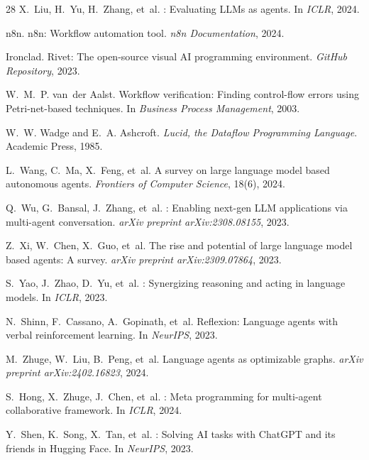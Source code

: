 \documentclass[11pt,twocolumn]{article}
\begin{document}
\begin{thebibliography}{28}
X.~Liu, H.~Yu, H.~Zhang, et~al.
: Evaluating {LLM}s as agents.
\newblock In \emph{ICLR}, 2024.

n8n.
\newblock n8n: Workflow automation tool.
\newblock \emph{n8n Documentation}, 2024.

Ironclad.
\newblock Rivet: The open-source visual {AI} programming environment.
\newblock \emph{GitHub Repository}, 2023.

W.~M.~P. van~der Aalst.
\newblock Workflow verification: Finding control-flow errors using {Petri}-net-based techniques.
\newblock In \emph{Business Process Management}, 2003.

W.~W. Wadge and E.~A. Ashcroft.
\newblock \emph{Lucid, the Dataflow Programming Language}.
\newblock Academic Press, 1985.

L.~Wang, C.~Ma, X.~Feng, et~al.
\newblock A survey on large language model based autonomous agents.
\newblock \emph{Frontiers of Computer Science}, 18(6), 2024.

Q.~Wu, G.~Bansal, J.~Zhang, et~al.
: Enabling next-gen {LLM} applications via multi-agent conversation.
\newblock \emph{arXiv preprint arXiv:2308.08155}, 2023.

Z.~Xi, W.~Chen, X.~Guo, et~al.
\newblock The rise and potential of large language model based agents: A survey.
\newblock \emph{arXiv preprint arXiv:2309.07864}, 2023.

S.~Yao, J.~Zhao, D.~Yu, et~al.
: Synergizing reasoning and acting in language models.
\newblock In \emph{ICLR}, 2023.

N.~Shinn, F.~Cassano, A.~Gopinath, et~al.
\newblock Reflexion: Language agents with verbal reinforcement learning.
\newblock In \emph{NeurIPS}, 2023.

M.~Zhuge, W.~Liu, B.~Peng, et~al.
\newblock Language agents as optimizable graphs.
\newblock \emph{arXiv preprint arXiv:2402.16823}, 2024.

S.~Hong, X.~Zhuge, J.~Chen, et~al.
: Meta programming for multi-agent collaborative framework.
\newblock In \emph{ICLR}, 2024.

Y.~Shen, K.~Song, X.~Tan, et~al.
: Solving {AI} tasks with {ChatGPT} and its friends in {Hugging Face}.
\newblock In \emph{NeurIPS}, 2023.

\end{thebibliography}
\end{document}
